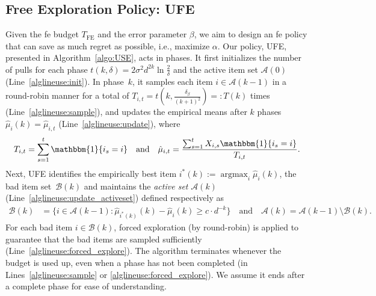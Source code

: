 \documentclass[twoside,11pt]{article}
\newcommand{\calA}{\mathcal{A}}
\newcommand{\calB}{\mathcal{B}}
\DeclareMathOperator*{\argmax}{argmax}
\newcommand{\Tfe}{T_{\mathrm{FE}}}
\newcommand{\hatmu}{\hat{\mu}}
\newcommand{\ouralgfe}{\textsc{UFE}}
\newcounter{algline}[algorithm]
\begin{document}
\subsection{Free Exploration Policy: \ouralgfe{}}
Given the \ac{fe} budget $\Tfe$ and the error parameter $\beta$, we aim to design an \ac{fe} policy that can save as much regret as possible, i.e., maximize $\alpha$.
Our policy, \ouralgfe{}, presented in Algorithm~\ref{algo:USE},  acts in phases.
It first initializes the  number of pulls for each phase $t(k,\delta) = 2 \sigma^2 d^{2k}\ln\frac{2}{\delta}$ and the active item set $\calA(0)$ (Line~\ref{alglineuse:init}).
In phase~$k$, it samples each item $i\in\calA(k-1)$ in a round-robin manner for a total of $T_{i,t}=t(k,\frac{\delta_\beta}{(k+1)^2})=:T(k)$ times 
(Line~\ref{alglineuse:sample}), and updates the empirical means after $k$ phases $\hatmu_{i}(k)=\hatmu_{i,t}$ (Line~\ref{alglineuse:update}), where 
\begin{align}\label{equ:statistics}
     T_{i,t} =\sum_{s=1}^t\mathbbm{1}\{i_s = i\}
    \quad\mbox{and}\quad
    \hatmu_{i,t}=\frac{\sum_{s=1}^{t}X_{i,s}\mathbbm{1}\{i_s = i\}}{T_{i,t}}.
\end{align}
Next, \ouralgfe{} identifies the empirically best item $i^*(k):= \argmax_i \hatmu_i(k)$, the bad item set~$\calB(k)$ and maintains the {\em   active set} $\calA(k)$ (Line~\ref{alglineuse:update_activeset}) defined respectively as
\begin{align}
    \calB(k) &= \big\{i\in\calA(k-1): \hatmu_{i^*(k)}(k)-\hatmu_{i}(k)\geq c\cdot d^{-k}\big\}\quad\mbox{and}\quad
    \calA(k) = \calA(k-1)\setminus \calB(k) \label{equ:use_active}.
\end{align}
For each bad item $i\in\calB(k)$, forced exploration (by round-robin) is applied to guarantee  that the bad items are sampled sufficiently  (Line~\ref{alglineuse:forced_explore}).
The algorithm  terminates whenever the budget is used up, 
even when a phase has not been completed (in Lines~\ref{alglineuse:sample} or \ref{alglineuse:forced_explore}).
We assume it ends after a complete phase for ease of understanding.
\end{document}
